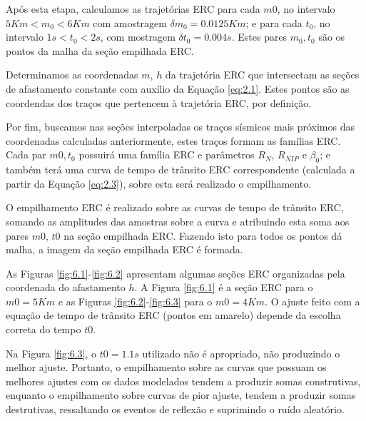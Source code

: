 Após esta etapa, calculamos as trajetórias ERC para cada $m0$, no intervalo $5Km<m_0<6Km$ com amostragem
$\delta m_0 = 0.0125Km$; e para cada $t_0$, no intervalo $1s<t_0<2s$, com mostragem $\delta t_0 = 0.004s$.
Estes pares $m_0, t_0$ são os pontos da malha da seção empilhada ERC.

Determinamos as coordenadas $m$, $h$ da trajetória ERC que intersectam as seções de afastamento constante com
auxílio da Equação \ref{eq:2.1}.
Estes pontos são as coordendas dos traços que pertencem à trajetória ERC, por definição.

Por fim, buscamos nas seções interpoladas
os traços sísmicos mais próximos das coordenadas calculadas anteriormente, estes traços formam as famílias ERC. 
Cada par $m0, t_0$ possuirá uma família ERC e parâmetros $R_N$, $R_{NIP}$ e $\beta_0$; e também terá uma curva de tempo
de trânsito ERC correspondente (calculada a partir da Equação \ref{eq:2.3}), sobre esta será realizado o empilhamento.

O empilhamento ERC é realizado sobre as curvas de tempo de trânsito ERC, somando as amplitudes
das amostras sobre a curva e atribuindo esta soma aos pares $m0$, $t0$ na seção empilhada ERC.
Fazendo isto para todos os pontos dá malha, a imagem da seção empilhada ERC é formada.

As Figuras \ref{fig:6.1}-\ref{fig:6.2} apresentam algumas seções ERC organizadas pela coordenada do afastamento $h$. A Figura
\ref{fig:6.1} é a seção ERC para o $m0=5Km$ e as Figuras \ref{fig:6.2}-\ref{fig:6.3} para o $m0=4Km$. O ajuste feito com
a equação de tempo de trânsito ERC (pontos em amarelo) depende da escolha correta do tempo $t0$. 

Na Figura \ref{fig:6.3}, 
o $t0=1.1s$ utilizado não é apropriado, não produzindo o melhor ajuste. Portanto, o empilhamento sobre as curvas que possuam
os melhores ajustes com os dados modelados tendem a produzir somas construtivas, enquanto o empilhamento sobre curvas de
pior ajuste, tendem a produzir somas destrutivas, ressaltando os eventos de reflexão e suprimindo o ruído aleatório.

